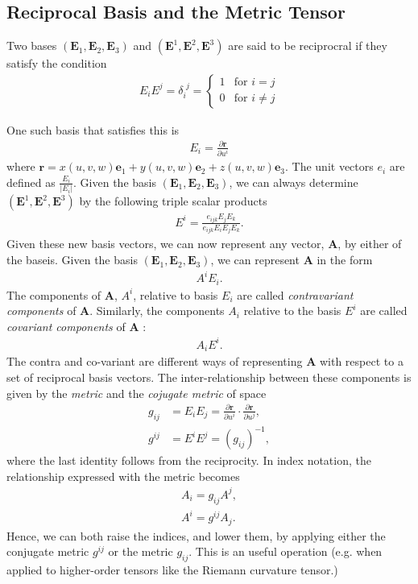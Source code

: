 \documentclass[main.tex]{subfiles}
\begin{document}
\subsection{Reciprocal Basis and the Metric Tensor}
\label{sec:metric}
\begin{mydef}
Two bases $(\mathbf{E}_1,\mathbf{E}_2,\mathbf{E}_3)$ and $(\mathbf{E}^1,\mathbf{E}^2,
\mathbf{E}^3)$ are said to be reciprocral if they satisfy the condition
\begin{align*}
E_iE^j = \delta^{\phantom{i}j}_i = 
\left\{\begin{matrix}
 1 & \mbox{for } i=j \\
 0 & \mbox{for } i \neq j
\end{matrix}\right.
\end{align*}
\end{mydef}
One such basis that satisfies this is
\begin{align*}
E_i = \frac{\partial \mathbf{r}}{\partial u^i}
\end{align*}
where $\mathbf{r} = x(u,v,w)\mathbf{e}_1 + y(u,v,w)\mathbf{e}_2 + z(u,v,w)\mathbf{e}_3$.
The unit vectors $e_i$ are defined as $\frac{E_i}{\left|E_i\right|}$.
Given the basis $(\mathbf{E}_1,\mathbf{E}_2,\mathbf{E}_3)$, we can always 
determine $(\mathbf{E}^1,\mathbf{E}^2,\mathbf{E}^3)$ by the following triple 
scalar products
\begin{align*}
E^i = \frac{e_{ijk}E_j E_k}{e_{ijk}E_iE_jE_k}.
\end{align*}
Given these new basis vectors, 
we can now represent any vector, $\mathbf{A}$, by either of the baseis. Given the basis 
$(\mathbf{E}_1,\mathbf{E}_2,\mathbf{E}_3)$, we can represent $\mathbf{A}$ in the form
\begin{align*}
A^i E_i.
\end{align*}
The components of $\mathbf{A}$, $A^i$, relative to basis $E_i$ are called 
\emph{contravariant components} of $\mathbf{A}$. 
Similarly, the components $A_i$ relative to the basis $E^i$ are called 
\emph{covariant components} of $\mathbf{A}$ :
\begin{align*}
A_i E^i.
\end{align*}
The contra and co-variant are different ways of representing $\mathbf{A}$ with respect to 
a set of reciprocal basis vectors. The inter-relationship between these components is given 
by the \emph{metric} and the \emph{cojugate metric} of space
\begin{align*}
g_{ij} &= E_iE_j = \frac{\partial \mathbf{r}}{\partial u^i} \cdot \frac{\partial \mathbf{r}}{\partial u^j}, \\
g^{ij} &= E^iE^j = (g_{ij})^{-1},
\end{align*}
where the last identity follows from the reciprocity.
In index notation, the relationship expressed with the metric becomes
\begin{align*}
A_i = g_{ij}A^j, \\
A^i = g^{ij}A_j.
\end{align*}
Hence, we can both raise the indices, and lower them, by applying either the 
conjugate metric $g^{ij}$ or the metric $g_{ij}$. This is an useful operation 
(e.g. when applied to higher-order tensors like the Riemann curvature tensor.)
\end{document}
